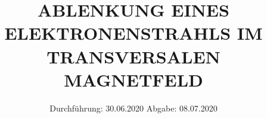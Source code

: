 

\subject{V502}
\title{ABLENKUNG EINES ELEKTRONENSTRAHLS IM TRANSVERSALEN MAGNETFELD }
\date{%
  Durchführung: 30.06.2020
  \hspace{3em}
  Abgabe: 08.07.2020
}



\maketitle
\thispagestyle{empty}
\tableofcontents
\newpage







\printbibliography{}



